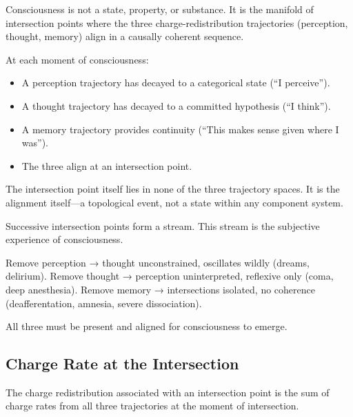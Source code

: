 \begin{principle}
\label{prin:consciousness-intersection}
Consciousness is not a state, property, or substance. It is the manifold of intersection points where the three charge-redistribution trajectories (perception, thought, memory) align in a causally coherent sequence.

At each moment of consciousness:
\begin{itemize}
\item A perception trajectory has decayed to a categorical state (``I perceive'').
\item A thought trajectory has decayed to a committed hypothesis (``I think'').
\item A memory trajectory provides continuity (``This makes sense given where I was'').
\item The three align at an intersection point.
\end{itemize}

The intersection point itself lies in none of the three trajectory spaces. It is the alignment itself—a topological event, not a state within any component system.

Successive intersection points form a stream. This stream is the subjective experience of consciousness.
\end{principle}

\begin{remark}
Remove perception → thought unconstrained, oscillates wildly (dreams, delirium).
Remove thought → perception uninterpreted, reflexive only (coma, deep anesthesia).
Remove memory → intersections isolated, no coherence (deafferentation, amnesia, severe dissociation).

All three must be present and aligned for consciousness to emerge.
\end{remark}

\subsection{Charge Rate at the Intersection}

The charge redistribution associated with an intersection point is the sum of charge rates from all three trajectories at the moment of intersection.

